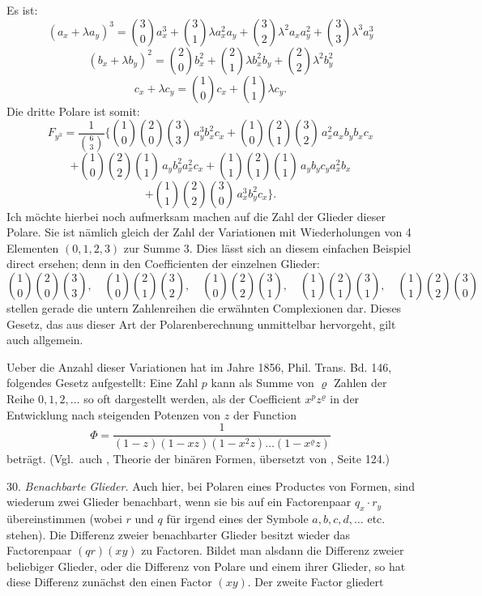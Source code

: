 \documentclass[11pt]{article}
\providecommand{\gesperrt}[1]{\textls[130]{#1}}
\providecommand{\weberpage}[1]{}
\let\Phi\varPhi
\begin{document}
\weberpage{31}
Es ist:
\[
(a_x + \lambda a_y)^3 = \binom{3}{0} a_x^3 + \binom{3}{1} \lambda a_x^2 a_y + \binom{3}{2} \lambda^2 a_x a_y^2 + \binom{3}{3} \lambda^3 a_y^3
\]
\[
(b_x + \lambda b_y)^2 = \binom{2}{0} b_x^2 + \binom{2}{1} \lambda b_x^2 b_y + \binom{2}{2} \lambda^2 b_y^2
\]
\[
c_x + \lambda c_y = \binom{1}{0} c_x + \binom{1}{1} \lambda c_y .
\]
Die dritte Polare ist somit:
\[
F_{y^3} = \frac{1}{\binom{6}{3}} \Big\{ \binom{1}{0}\binom{2}{0}\binom{3}{3}\, a_y^3 b_x^2 c_x + \binom{1}{0}\binom{2}{1}\binom{3}{2}\, a_x^2 a_x b_y b_x c_x %
\]
\[
+ \binom{1}{0}\binom{2}{2}\binom{1}{1}\, a_y b_y^2 a_x^2 c_x + \binom{1}{1}\binom{2}{1}\binom{1}{1}\, a_y b_y c_y a_x^2 b_x %
\]
\[
+ \binom{1}{1}\binom{2}{2}\binom{3}{0}\, a_x^3 b_y^2 c_x \Big\} . %
\]
Ich möchte hierbei noch aufmerksam machen auf die Zahl der Glieder dieser Polare. Sie ist nämlich gleich der Zahl der Variationen mit Wiederholungen von 4 Elementen $(0, 1, 2, 3)$ zur Summe 3. Dies lässt sich an diesem einfachen Beispiel direct ersehen; denn in den Coefficienten der einzelnen Glieder:
\[
\binom{1}{0}\binom{2}{0}\binom{3}{3}, \quad \binom{1}{0}\binom{2}{1}\binom{3}{2}, \quad \binom{1}{0}\binom{2}{2}\binom{3}{1}, \quad \binom{1}{1}\binom{2}{1}\binom{3}{1}, \quad \binom{1}{1}\binom{2}{2}\binom{3}{0}
\]
stellen gerade die untern Zahlenreihen die erwähnten Complexionen dar. Dieses Gesetz, das aus dieser Art der Polarenberechnung unmittelbar hervorgeht, gilt auch allgemein.

Ueber die Anzahl dieser Variationen hat \gesperrt{Cayley} im Jahre 1856, Phil. Trans. Bd. 146, folgendes Gesetz aufgestellt:
\glqq Eine Zahl $p$ kann als Summe von $\varrho$ Zahlen der Reihe
$0, 1, 2, \ldots$ so oft dargestellt werden, als der Coefficient $x^p z^{\varrho}$
in der Entwicklung nach steigenden Potenzen von $z$ der
Function
\[
\Phi = \frac{1}{(1-z)(1-xz)(1-x^2 z) \ldots (1-x^{\varrho} z)}
\]
beträgt. (Vgl.\ auch \gesperrt{Faà di Bruno}, Theorie der binären Formen, übersetzt von \gesperrt{Walter}, Seite 124.)

30. \textit{Benachbarte Glieder.} Auch hier, bei Polaren eines Productes von Formen, sind wiederum zwei Glieder benachbart, wenn sie bis auf ein Factorenpaar $q_x \cdot r_y$ übereinstimmen (wobei $r$ und $q$ für irgend eines der Symbole $a, b, c, d, \ldots$ etc. stehen). Die Differenz zweier benachbarter Glieder besitzt wieder das Factorenpaar $(qr)(xy)$ zu Factoren. Bildet man alsdann die Differenz zweier beliebiger Glieder, oder die Differenz von Polare und einem ihrer Glieder, so hat diese Differenz zunächst den einen Factor $(xy)$. Der zweite Factor gliedert
\end{document}
